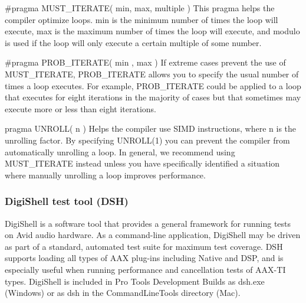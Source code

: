 \begin{DoxyItemize}
\item {\ttfamily \#pragma M\+U\+S\+T\+\_\+\+I\+T\+E\+R\+A\+T\+E( min, max, multiple )}  This pragma helps the compiler optimize loops. min is the minimum number of times the loop will execute, max is the maximum number of times the loop will execute, and modulo is used if the loop will only execute a certain multiple of some number. ~\newline
  
\item {\ttfamily \#pragma P\+R\+O\+B\+\_\+\+I\+T\+E\+R\+A\+T\+E( min , max )}  If extreme cases prevent the use of {\ttfamily M\+U\+S\+T\+\_\+\+I\+T\+E\+R\+A\+TE}, {\ttfamily P\+R\+O\+B\+\_\+\+I\+T\+E\+R\+A\+TE} allows you to specify the usual number of times a loop executes. For example, {\ttfamily P\+R\+O\+B\+\_\+\+I\+T\+E\+R\+A\+TE} could be applied to a loop that executes for eight iterations in the majority of cases but that sometimes may execute more or less than eight iterations. ~\newline
  
\item {\ttfamily pragma U\+N\+R\+O\+L\+L( n )}  Helps the compiler use S\+I\+MD instructions, where {\ttfamily n} is the unrolling factor. By specifying {\ttfamily U\+N\+R\+O\+L\+L(1)} you can prevent the compiler from automatically unrolling a loop. In general, we recommend using {\ttfamily M\+U\+S\+T\+\_\+\+I\+T\+E\+R\+A\+TE} instead unless you have specifically identified a situation where manually unrolling a loop improves performance.  
\end{DoxyItemize}

\hypertarget{a00832_subsection__digishell_test_tool}{}\subsubsection{Digi\+Shell test tool (\+D\+S\+H)}\label{a00832_subsection__digishell_test_tool}
 Digi\+Shell is a software tool that provides a general framework for running tests on Avid audio hardware. As a command-\/line application, Digi\+Shell may be driven as part of a standard, automated test suite for maximum test coverage. D\+SH supports loading all types of A\+AX plug-\/ins including Native and D\+SP, and is especially useful when running performance and cancellation tests of A\+A\+X-\/\+TI types. Digi\+Shell is included in Pro Tools Development Builds as {\ttfamily dsh.\+exe} (Windows) or as {\ttfamily dsh} in the {\ttfamily Command\+Line\+Tools} directory (Mac).

